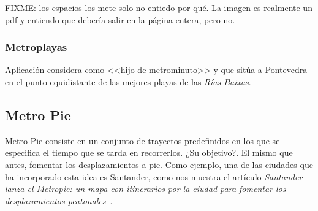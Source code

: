 FIXME: los espacios los mete solo no entiedo por qué. La imagen es realmente un pdf y entiendo que debería salir en la página entera, pero no.

\subsubsection{Metroplayas}
Aplicación considera como <<hijo de metrominuto>> y que sitúa a Pontevedra en el punto equidistante de las mejores playas de las \textit{Rías Baixas}.


\subsection{Metro Pie}
Metro Pie consiste en un conjunto de trayectos predefinidos en los que se especifica el tiempo que se tarda en recorrerlos. ¿Su objetivo?. El mismo que antes, fomentar los desplazamientos a pie. Como ejemplo, una de las ciudades que ha incorporado esta idea es Santander, como nos muestra el artículo \textit{Santander lanza el Metropie: un mapa con itinerarios por la ciudad para fomentar los desplazamientos peatonales}~\cite{art:metropie}.
